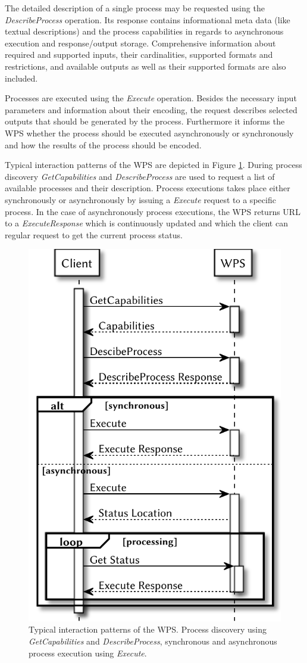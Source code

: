 	The detailed description of a single process may be requested using the \emph{DescribeProcess} operation. Its response contains informational meta data (like textual descriptions) and the process capabilities in regards to asynchronous execution and response/output storage. Comprehensive information about required and supported inputs, their cardinalities, supported formats and restrictions, and available outputs as well as their supported formats are also included.

	Processes are executed using the \emph{Execute} operation. Besides the necessary input parameters and information about their encoding, the request describes selected outputs that should be generated by the process. Furthermore it informs the \ac{WPS} whether the process should be executed asynchronously or synchronously and how the results of the process should be encoded.

	Typical interaction patterns of the \acl{WPS} are depicted in Figure \ref{fig:sd:wps}. During process discovery \emph{GetCapabilities} and \emph{DescribeProcess} are used to request a list of available processes and their description. Process executions takes place either synchronously or asynchronously by issuing a \emph{Execute} request to a specific process. In the case of asynchronously process executions, the \ac{WPS} returns URL to a \emph{ExecuteResponse} which is continuously updated and which the client can regular request to get the current process status.
	\begin{figure}[!htb]
		\centering
		\includegraphics[width=.4\textwidth]{figures/sequence-diagramm-wps.pdf}
		\caption{\label{fig:sd:wps} Typical interaction patterns of the \acl{WPS}. Process discovery using \emph{GetCapabilities} and \emph{DescribeProcess}, synchronous and asynchronous process execution using \emph{Execute}.}
	\end{figure}

